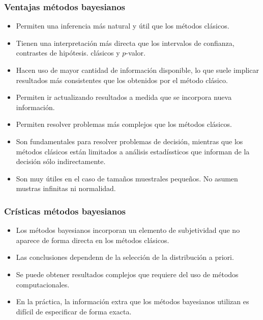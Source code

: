 \subsubsection{Ventajas métodos bayesianos}

\begin{itemize}
    \item Permiten una inferencia más natural y útil que los métodos clásicos.
    \item Tienen una interpretación más directa que los intervalos de confianza, contrastes de hipótesis.
          clásicos y $p$-valor.
    \item Hacen uso de mayor cantidad de información disponible, lo que suele implicar resultados más consistentes que los obtenidos por el método clásico.
    \item Permiten ir actualizando resultados a medida que se incorpora nueva información.
    \item Permiten resolver problemas más complejos que los métodos clásicos.
    \item Son fundamentales para resolver problemas de decisión, mientras que los métodos clásicos están limitados a análisis estadíssticos que informan de la decisión sólo indirectamente.
    \item Son muy útiles en el caso de tamaños muestrales pequeños. No asumen mustras infinitas ni normalidad.
\end{itemize}

\subsubsection{Crísticas métodos bayesianos}
\begin{itemize}
    \item Los métodos bayesianos incorporan un elemento de subjetividad que no aparece de forma directa en los métodos clásicos.
    \item Las conclusiones dependenn de la selección de la distribución a priori.
    \item Se puede obtener resultados complejos que requiere del uso de métodos computacionales.
    \item En la práctica, la información extra que los métodos bayesianos utilizan es difícil de especificar de forma exacta.
\end{itemize}